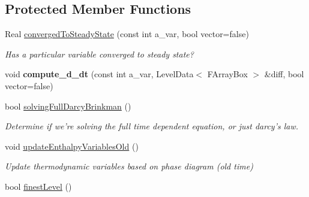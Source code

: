 \subsection*{Protected Member Functions}
\begin{DoxyCompactItemize}
\item 
\hypertarget{class_a_m_r_level_mushy_layer_aad8e3d2cda90acb68c1086e0e08096a6}{Real \hyperlink{class_a_m_r_level_mushy_layer_aad8e3d2cda90acb68c1086e0e08096a6}{converged\-To\-Steady\-State} (const int a\-\_\-var, bool vector=false)}\label{class_a_m_r_level_mushy_layer_aad8e3d2cda90acb68c1086e0e08096a6}

\begin{DoxyCompactList}\small\item\em Has a particular variable converged to steady state? \end{DoxyCompactList}\item 
\hypertarget{class_a_m_r_level_mushy_layer_a0f76ac50feba2ebcf8cd431948690a76}{void {\bfseries compute\-\_\-d\-\_\-dt} (const int a\-\_\-var, Level\-Data$<$ F\-Array\-Box $>$ \&diff, bool vector=false)}\label{class_a_m_r_level_mushy_layer_a0f76ac50feba2ebcf8cd431948690a76}

\item 
\hypertarget{class_a_m_r_level_mushy_layer_ab86dcb9c77a0696fbb3fbc7d6a1d09b3}{bool \hyperlink{class_a_m_r_level_mushy_layer_ab86dcb9c77a0696fbb3fbc7d6a1d09b3}{solving\-Full\-Darcy\-Brinkman} ()}\label{class_a_m_r_level_mushy_layer_ab86dcb9c77a0696fbb3fbc7d6a1d09b3}

\begin{DoxyCompactList}\small\item\em Determine if we're solving the full time dependent equation, or just darcy's law. \end{DoxyCompactList}\item 
\hypertarget{class_a_m_r_level_mushy_layer_a540bac726905fcc0af2fcfe7a8b7fed1}{void \hyperlink{class_a_m_r_level_mushy_layer_a540bac726905fcc0af2fcfe7a8b7fed1}{update\-Enthalpy\-Variables\-Old} ()}\label{class_a_m_r_level_mushy_layer_a540bac726905fcc0af2fcfe7a8b7fed1}

\begin{DoxyCompactList}\small\item\em Update thermodynamic variables based on phase diagram (old time) \end{DoxyCompactList}\item 
\hypertarget{class_a_m_r_level_mushy_layer_ad978d1a9a28c1ef557aa348807534eb4}{bool \hyperlink{class_a_m_r_level_mushy_layer_ad978d1a9a28c1ef557aa348807534eb4}{finest\-Level} ()}\label{class_a_m_r_level_mushy_layer_ad978d1a9a28c1ef557aa348807534eb4}


\end{DoxyCompactItemize}
